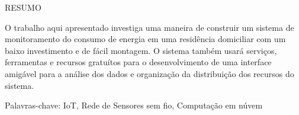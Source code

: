 \begin{titlepage}

\begin{center}
\large
RESUMO
\end{center}

O trabalho aqui apresentado investiga uma maneira de construir um sistema de monitoramento do consumo de energia em uma residência domiciliar com um baixo investimento e de fácil montagem. O sistema também usará serviços, ferramentas e recursos gratuítos para o desenvolvimento de uma interface amigável para a análise dos dados e organização da distribuição dos recursos do sistema.

\vspace{10mm}
\large
Palavras-chave: IoT, Rede de Sensores sem fio, Computação em núvem
\vfill


\end{titlepage}